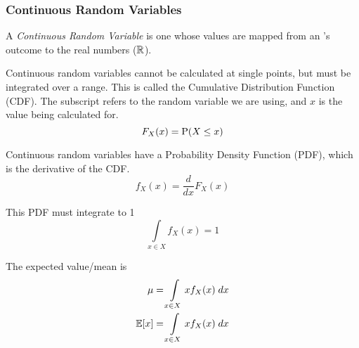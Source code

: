 \subsubsection{Continuous Random Variables}\label{subsubsec:Continuous_Random_Variables}
\begin{definition}\label{def:Continuous_Random_Variable}
  A \emph{Continuous Random Variable} is one whose values are mapped from an 's outcome to the real numbers ($\operatorname{\mathbb{R}}$).

  Continuous random variables cannot be calculated at single points, but must be integrated over a range.
  This is called the Cumulative Distribution Function (CDF).
  The subscript refers to the random variable we are using, and $x$ is the value being calculated for.
  \begin{equation}\label{eq:Continuous_Random_Variable-CDF}
    F_{X}(x) = \operatorname{\operatorname{P}}(X \leq x)
  \end{equation}

  Continuous random variables have a Probability Density Function (PDF), which is the derivative of the CDF.\
  \begin{equation}\label{eq:Continuous_Random_Variable-PDF}
    f_{X}(x) = \frac{d}{dx} F_{X}(x)
  \end{equation}

  This PDF must integrate to 1
  \begin{equation}\label{eq:Continuous_Random_Variable-Integrate_to_One}
    \int\limits_{x \in X} f_{X}(x) = 1
  \end{equation}

  The expected value/mean is
  \begin{equation}\label{eq:Continuous_Random_Variable-Expected_Value}
    \begin{aligned}
      \mu &= \int\limits_{x \in X} x f_{X}(x) \; dx \\
      \operatorname{\operatorname{\mathbb{E}}}[x] &= \int\limits_{x \in X} x f_{X}(x) \; dx \\
    \end{aligned}
  \end{equation}

\end{definition}
